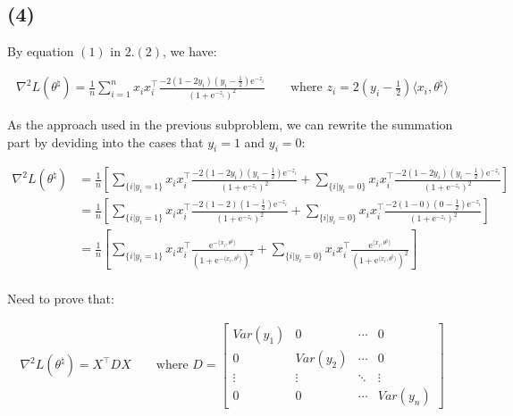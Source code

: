 \documentclass{article}
\begin{document}
\subsection*{(4)}

By equation $(1)$ in $2. (2)$, we have:

\begin{align*}
    \nabla^2 L(\theta^{\natural}) = \frac{1}{n} \sum_{i = 1}^n x_i x_i^\intercal  \frac{-2(1 - 2y_i)(y_i - \frac{1}{2})\mathrm{e}^{-z_i}}{(1 +\mathrm{e}^{-z_i})^2}
    \qquad \text{where } z_i = 2(y_i - \frac{1}{2})\langle x_i, \theta^{\natural} \rangle 
\end{align*}

As the approach used in the previous subproblem, we can rewrite the summation part 
by deviding into the cases that $y_i = 1$ and $y_i = 0$:

\begin{align*}
    \nabla^2 L(\theta^{\natural}) 
    &= \frac{1}{n} \left[ \sum_{\{i | y_i = 1\}} x_i x_i^\intercal  \frac{-2(1 - 2y_i)(y_i - \frac{1}{2})\mathrm{e}^{-z_i}}{(1 +\mathrm{e}^{-z_i})^2} +\sum_{\{i | y_i = 0\}} x_i x_i^\intercal  \frac{-2(1 - 2y_i)(y_i - \frac{1}{2})\mathrm{e}^{-z_i}}{(1 +\mathrm{e}^{-z_i})^2} \right] \\
    &= \frac{1}{n} \left[ \sum_{\{i | y_i = 1\}} x_i x_i^\intercal  \frac{-2(1 - 2)(1 - \frac{1}{2})\mathrm{e}^{-z_i}}{(1 +\mathrm{e}^{-z_i})^2} +\sum_{\{i | y_i = 0\}} x_i x_i^\intercal  \frac{-2(1 - 0)(0 - \frac{1}{2})\mathrm{e}^{-z_i}}{(1 +\mathrm{e}^{-z_i})^2} \right] \\
    &= \frac{1}{n} \left[ \sum_{\{i | y_i = 1\}} x_i x_i^\intercal  \frac{\mathrm{e}^{-\langle x_i, \theta^{\natural} \rangle}}{(1 +\mathrm{e}^{-\langle x_i, \theta^{\natural} \rangle})^2} +\sum_{\{i | y_i = 0\}} x_i x_i^\intercal  \frac{\mathrm{e}^{\langle x_i, \theta^{\natural} \rangle}}{(1 +\mathrm{e}^{\langle x_i, \theta^{\natural} \rangle})^2} \right] \tag{1} \\
\end{align*}

Need to prove that:

\begin{align*}
    \nabla^2 L(\theta^{\natural})  = X^\intercal D X 
    \qquad \text{where } D = \begin{bmatrix}
        Var(y_1) & 0 & \cdots & 0 \\
        0 & Var(y_2) & \cdots & 0 \\
        \vdots & \vdots & \ddots & \vdots \\
        0 & 0 & \cdots & Var(y_n)
    \end{bmatrix}
\end{align*}
\end{document}
